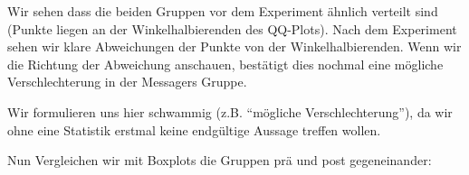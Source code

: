 \documentclass[]{article}
\newenvironment{Shaded}{\begin{snugshade}}{\end{snugshade}}
\newcommand{\CommentTok}[1]{\textcolor[rgb]{0.56,0.35,0.01}{\textit{#1}}}
\newcommand{\DataTypeTok}[1]{\textcolor[rgb]{0.13,0.29,0.53}{#1}}
\newcommand{\DecValTok}[1]{\textcolor[rgb]{0.00,0.00,0.81}{#1}}
\newcommand{\FloatTok}[1]{\textcolor[rgb]{0.00,0.00,0.81}{#1}}
\newcommand{\KeywordTok}[1]{\textcolor[rgb]{0.13,0.29,0.53}{\textbf{#1}}}
\newcommand{\NormalTok}[1]{#1}
\newcommand{\OperatorTok}[1]{\textcolor[rgb]{0.81,0.36,0.00}{\textbf{#1}}}
\newcommand{\OtherTok}[1]{\textcolor[rgb]{0.56,0.35,0.01}{#1}}
\newcommand{\StringTok}[1]{\textcolor[rgb]{0.31,0.60,0.02}{#1}}
\begin{document}
Wir sehen dass die beiden Gruppen vor dem Experiment ähnlich verteilt
sind (Punkte liegen an der Winkelhalbierenden des QQ-Plots). Nach dem
Experiment sehen wir klare Abweichungen der Punkte von der
Winkelhalbierenden. Wenn wir die Richtung der Abweichung anschauen,
bestätigt dies nochmal eine mögliche Verschlechterung in der Messagers
Gruppe.

Wir formulieren uns hier schwammig (z.B. ``mögliche Verschlechterung''),
da wir ohne eine Statistik erstmal keine endgültige Aussage treffen
wollen.

Nun Vergleichen wir mit Boxplots die Gruppen prä und post gegeneinander:

\begin{Shaded}
\end{Shaded}
\end{document}
